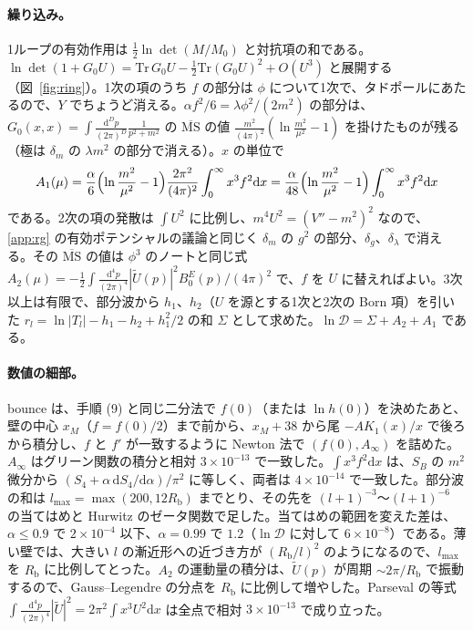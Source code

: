 \documentclass[a4paper,10pt]{ltjsarticle}
\newcommand{\dd}{\mathrm{d}}
\begin{document}
\paragraph{繰り込み。}1ループの有効作用は $\frac12\ln\det(M/M_0)$ と対抗項の和である。$\ln\det(1+G_0U)=\mathrm{Tr}\,G_0U-\frac12\mathrm{Tr}(G_0U)^2+O(U^3)$ と展開する（図~\ref{fig:ring}）。1次の項のうち $f$ の部分は $\phi$ について1次で、タドポールにあたるので、$Y$ でちょうど消える。$\alpha f^2/6=\lambda\phi^2/(2m^2)$ の部分は、$G_0(x,x)=\int\frac{\dd^Dp}{(2\pi)^D}\frac{1}{p^2+m^2}$ の $\overline{\mathrm{MS}}$ の値 $\frac{m^2}{(4\pi)^2}(\ln\frac{m^2}{\mu^2}-1)$ を掛けたものが残る（極は $\delta_m$ の $\lambda m^2$ の部分で消える）。$x$ の単位で
\begin{equation*}
A_1(\mu)=\frac{\alpha}{6}\Bigl(\ln\frac{m^2}{\mu^2}-1\Bigr)\frac{2\pi^2}{(4\pi)^2}\int_0^\infty x^3f^2\dd x=\frac{\alpha}{48}\Bigl(\ln\frac{m^2}{\mu^2}-1\Bigr)\int_0^\infty x^3f^2\dd x
\end{equation*}
である。2次の項の発散は $\int U^2$ に比例し、$m^4U^2=(V''-m^2)^2$ なので、\ref{app:rg} の有効ポテンシャルの議論と同じく $\delta_m$ の $g^2$ の部分、$\delta_g$、$\delta_\lambda$ で消える。その $\overline{\mathrm{MS}}$ の値は $\phi^3$ のノートと同じ式 $A_2(\mu)=-\frac12\int\frac{\dd^4p}{(2\pi)^4}|\tilde U(p)|^2B_0^E(p)/(4\pi)^2$ で、$f$ を $U$ に替えればよい。3次以上は有限で、部分波から $h_1$、$h_2$（$U$ を源とする1次と2次の Born 項）を引いた $r_l=\ln|T_l|-h_1-h_2+h_1^2/2$ の和 $\Sigma$ として求めた。$\ln\mathcal D=\Sigma+A_2+A_1$ である。

\paragraph{数値の細部。}bounce は、手順 (9) と同じ二分法で $f(0)$（または $\ln h(0)$）を決めたあと、壁の中心 $x_M$（$f=f(0)/2$）まで前から、$x_M+38$ から尾 $-AK_1(x)/x$ で後ろから積分し、$f$ と $f'$ が一致するように Newton 法で $(f(0),A_\infty)$ を詰めた。$A_\infty$ はグリーン関数の積分と相対 $3\times10^{-13}$ で一致した。$\int x^3f^2\dd x$ は、$S_B$ の $m^2$ 微分から $(S_4+\alpha\,\dd S_4/\dd\alpha)/\pi^2$ に等しく、両者は $4\times10^{-14}$ で一致した。部分波の和は $l_{\max}=\max(200,12R_{\mathrm b})$ までとり、その先を $(l+1)^{-3}$〜$(l+1)^{-6}$ の当てはめと Hurwitz のゼータ関数で足した。当てはめの範囲を変えた差は、$\alpha\le0.9$ で $2\times10^{-4}$ 以下、$\alpha=0.99$ で $1.2$（$\ln\mathcal D$ に対して $6\times10^{-8}$）である。薄い壁では、大きい $l$ の漸近形への近づき方が $(R_{\mathrm b}/l)^2$ のようになるので、$l_{\max}$ を $R_{\mathrm b}$ に比例してとった。$A_2$ の運動量の積分は、$\tilde U(p)$ が周期 $\sim2\pi/R_{\mathrm b}$ で振動するので、Gauss--Legendre の分点を $R_{\mathrm b}$ に比例して増やした。Parseval の等式 $\int\frac{\dd^4p}{(2\pi)^4}|\tilde U|^2=2\pi^2\int x^3U^2\dd x$ は全点で相対 $3\times10^{-13}$ で成り立った。
\end{document}
